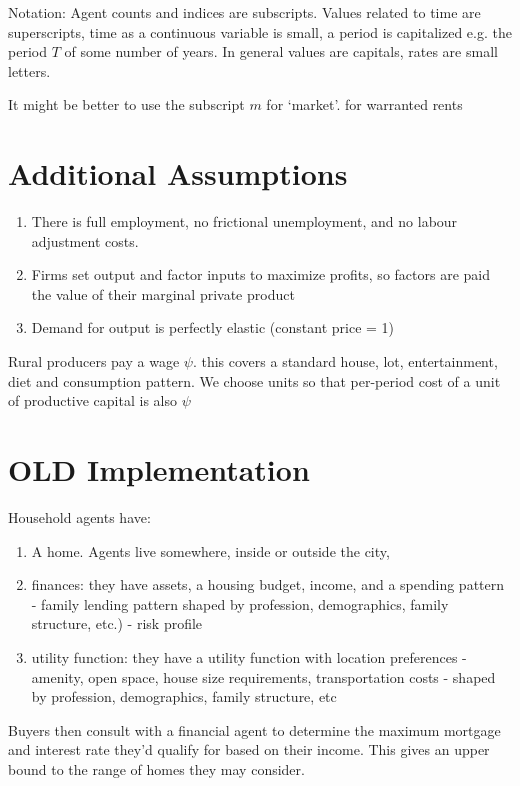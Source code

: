 Notation: 
Agent counts and indices are subscripts.
Values related to time are superscripts, time as a continuous 
variable is small, a period is capitalized e.g. the period $T$ of some number of years. 
In general values are capitals, rates are small letters.

It might be better to use the subscript $m$ for `market'.  for warranted rents

\section{Additional Assumptions}
\begin{enumerate}
\item There is full employment, no frictional unemployment, and no labour adjustment costs.
\item Firms set output and factor inputs to maximize profits, so factors are paid the value of their marginal private product
\item Demand for output is perfectly elastic (constant price = 1)
\end{enumerate}


Rural producers pay a wage $\psi$. this covers a standard house, lot, entertainment, diet and consumption pattern. We  choose units so that per-period cost of a unit of productive capital is also $\psi$


\section{OLD Implementation}


Household agents have:
\begin{enumerate}
   \item A home. Agents live somewhere, inside or outside the city,
   \item finances: they have assets, a housing budget, income, and a spending pattern - family lending pattern  
   shaped by profession, demographics, family structure, etc.) - risk profile
   \item utility function: they have a utility function with location  preferences - amenity, open space, house size requirements, transportation costs - shaped by profession, demographics, family structure, etc
\end{enumerate}	

Buyers then consult with a financial agent to determine the maximum mortgage and interest rate they'd qualify for based on their income. This gives an upper bound to the range of homes they may consider. 

